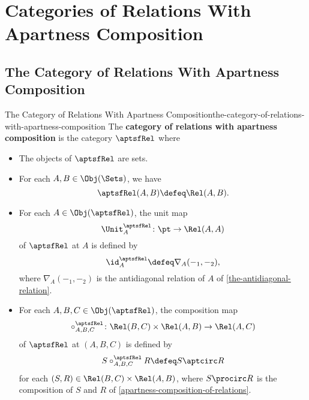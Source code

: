 \section{Categories of Relations With Apartness Composition}\label{section-categories-of-relations-with-apartness-composition}
\subsection{The Category of Relations With Apartness Composition}\label{subsection-the-category-of-relations-with-apartness-composition}
\begin{definition}{The Category of Relations With Apartness Composition}{the-category-of-relations-with-apartness-composition}%
    The \textbf{category of relations with apartness composition} is the category $\aptsfRel$ where
    \begin{itemize}
        \item{}The objects of $\aptsfRel$ are sets.
        \item{}For each $A,B\in\Obj(\Sets)$, we have
            \[
                \aptsfRel(A,B)
                \defeq
                \Rel(A,B).
            \]%
        \item{}For each $A\in\Obj(\aptsfRel)$, the unit map
            \[
                \Unit^{\aptsfRel}_{A}
                \colon
                \pt
                \to
                \Rel(A,A)
            \]%
            of $\aptsfRel$ at $A$ is defined by
            \[
                \id^{\aptsfRel}_{A}
                \defeq
                \nabla_{A}(-_{1},-_{2}),
            \]%
            where $\nabla_{A}(-_{1},-_{2})$ is the antidiagonal relation of $A$ of \cref{the-antidiagonal-relation}.
        \item{}For each $A,B,C\in\Obj(\aptsfRel)$, the composition map
            \[
                \circ^{\aptsfRel}_{A,B,C}%
                \colon%
                \Rel(B,C)%
                \times%
                \Rel(A,B)%
                \to%
                \Rel(A,C)%
            \]%
            of $\aptsfRel$ at $(A,B,C)$ is defined by%
            \[
                S\mathbin{{\circ}^{\aptsfRel}_{A,B,C}}R
                \defeq
                S\aptcirc R
            \]%
            for each $(S,R)\in\Rel(B,C)\times\Rel(A,B)$, where $S\procirc R$ is the composition of $S$ and $R$ of \cref{apartness-composition-of-relations}.
    \end{itemize}
\end{definition}
